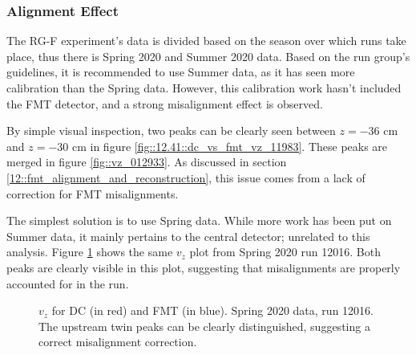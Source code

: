 \subsubsection{Alignment Effect}
\label{sssec::alignment_effect}
    The RG-F experiment's data is divided based on the season over which runs take place, thus there is Spring 2020 and Summer 2020 data.
    Based on the run group's guidelines, it is recommended to use Summer data, as it has seen more calibration than the Spring data.
    However, this calibration work hasn't included the FMT detector, and a strong misalignment effect is observed.

    By simple visual inspection, two peaks can be clearly seen between $z = -36$ cm and $z = -30$ cm in figure \ref{fig::12.41::dc_vs_fmt_vz_11983}.
    These peaks are merged in figure \ref{fig::vz_012933}.
    As discussed in section \ref{12::fmt_alignment_and_reconstruction}, this issue comes from a lack of correction for FMT misalignments.

    The simplest solution is to use Spring data.
    While more work has been put on Summer data, it mainly pertains to the central detector; unrelated to this analysis.
    Figure \ref{fig::vz_012016} shows the same $v_z$ plot from Spring 2020 run 12016.
    Both peaks are clearly visible in this plot, suggesting that misalignments are properly accounted for in the run.

    \begin{figure}[t!]
        \centering{}
        \caption[$v_z$ for DC and FMT, run 12016]{$v_z$ for DC (in red) and FMT (in blue). Spring 2020 data, run 12016. The upstream twin peaks can be clearly distinguished, suggesting a correct misalignment correction.}
        \label{fig::vz_012016}
    \end{figure}
